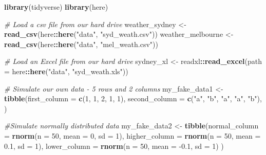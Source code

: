 \documentclass[
]{article}
\newenvironment{Shaded}{\begin{snugshade}}{\end{snugshade}}
\newcommand{\CommentTok}[1]{\textcolor[rgb]{0.56,0.35,0.01}{\textit{#1}}}
\newcommand{\DataTypeTok}[1]{\textcolor[rgb]{0.13,0.29,0.53}{#1}}
\newcommand{\DecValTok}[1]{\textcolor[rgb]{0.00,0.00,0.81}{#1}}
\newcommand{\FloatTok}[1]{\textcolor[rgb]{0.00,0.00,0.81}{#1}}
\newcommand{\KeywordTok}[1]{\textcolor[rgb]{0.13,0.29,0.53}{\textbf{#1}}}
\newcommand{\NormalTok}[1]{#1}
\newcommand{\OperatorTok}[1]{\textcolor[rgb]{0.81,0.36,0.00}{\textbf{#1}}}
\newcommand{\StringTok}[1]{\textcolor[rgb]{0.31,0.60,0.02}{#1}}
\begin{document}
\begin{Shaded}
\begin{Highlighting}[]
\KeywordTok{library}\NormalTok{(tidyverse)}
\KeywordTok{library}\NormalTok{(here)}

\CommentTok{# Load a csv file from our hard drive}
\NormalTok{weather_sydney <-}\StringTok{ }\KeywordTok{read_csv}\NormalTok{(here}\OperatorTok{::}\KeywordTok{here}\NormalTok{(}\StringTok{"data"}\NormalTok{, }\StringTok{"syd_weath.csv"}\NormalTok{))}
\NormalTok{weather_melbourne <-}\StringTok{ }\KeywordTok{read_csv}\NormalTok{(here}\OperatorTok{::}\KeywordTok{here}\NormalTok{(}\StringTok{"data"}\NormalTok{, }\StringTok{"mel_weath.csv"}\NormalTok{))}

\CommentTok{# Load an Excel file from our hard drive}
\NormalTok{sydney_xl <-}\StringTok{ }\NormalTok{readxl}\OperatorTok{::}\KeywordTok{read_excel}\NormalTok{(}\DataTypeTok{path =}\NormalTok{ here}\OperatorTok{::}\KeywordTok{here}\NormalTok{(}\StringTok{"data"}\NormalTok{, }\StringTok{"syd_weath.xls"}\NormalTok{))}

\CommentTok{# Simulate our own data - 5 rows and 2 columns}
\NormalTok{my_fake_data1 <-}\StringTok{ }\KeywordTok{tibble}\NormalTok{(}\DataTypeTok{first_column =} \KeywordTok{c}\NormalTok{(}\DecValTok{1}\NormalTok{, }\DecValTok{1}\NormalTok{, }\DecValTok{2}\NormalTok{, }\DecValTok{1}\NormalTok{, }\DecValTok{1}\NormalTok{),}
                        \DataTypeTok{second_column =} \KeywordTok{c}\NormalTok{(}\StringTok{"a"}\NormalTok{, }\StringTok{"b"}\NormalTok{, }\StringTok{"a"}\NormalTok{, }\StringTok{"a"}\NormalTok{, }\StringTok{"b"}\NormalTok{),}
\NormalTok{                        )}

\CommentTok{#Simulate normally distributed data}
\NormalTok{my_fake_data2 <-}\StringTok{ }\KeywordTok{tibble}\NormalTok{(}\DataTypeTok{normal_column =} \KeywordTok{rnorm}\NormalTok{(}\DataTypeTok{n =} \DecValTok{50}\NormalTok{, }\DataTypeTok{mean =} \DecValTok{0}\NormalTok{, }\DataTypeTok{sd =} \DecValTok{1}\NormalTok{),}
                        \DataTypeTok{higher_column =} \KeywordTok{rnorm}\NormalTok{(}\DataTypeTok{n =} \DecValTok{50}\NormalTok{, }\DataTypeTok{mean =} \FloatTok{0.1}\NormalTok{, }\DataTypeTok{sd =} \DecValTok{1}\NormalTok{),}
                        \DataTypeTok{lower_column =} \KeywordTok{rnorm}\NormalTok{(}\DataTypeTok{n =} \DecValTok{50}\NormalTok{, }\DataTypeTok{mean =} \FloatTok{-0.1}\NormalTok{, }\DataTypeTok{sd =} \DecValTok{1}\NormalTok{)}
\NormalTok{                        )}
\end{Highlighting}
\end{Shaded}
\end{document}
